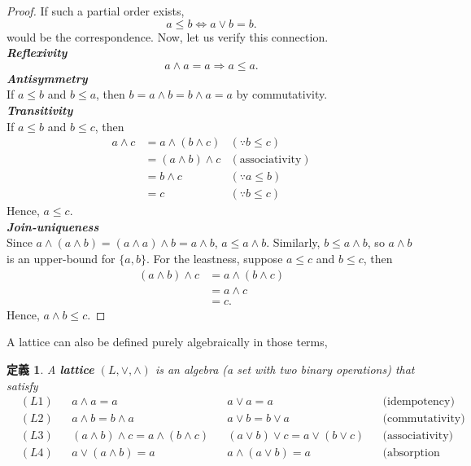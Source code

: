 \documentclass[a4j,12pt]{jarticle}
\numberwithin{equation}{section}
\newcommand{\itbf}[1]{\textit{\textbf{#1}}}
\newtheorem{dfn}{定義}[section]
\begin{document}
\begin{proof}
  If such a partial order exists,
  \begin{equation}
    a \le b \Leftrightarrow a \vee b = b.
  \end{equation}
  would be the correspondence. Now, let us verify this connection.\\
  \itbf{Reflexivity}\\
  \begin{equation}
   a \wedge a = a \Rightarrow a \le a.
  \end{equation}
  \itbf{Antisymmetry}\\
  If $a \le b$ and $b \le a$, then $b = a \wedge b = b \wedge a = a$ by commutativity.\\
  \itbf{Transitivity}\\
  If $a \le b$ and $b \le c$, then
  \begin{align*}
    a \wedge c &= a \wedge (b \wedge c) & (\because b \le c)\\
               &= (a \wedge b) \wedge c & (\text{associativity})\\
               &= b \wedge c & (\because a \le b)\\
               &= c & (\because b \le c)
  \end{align*}
  Hence, $a \le c$.\\
  \itbf{Join-uniqueness}\\
  Since $a \wedge (a \wedge b) = (a \wedge a) \wedge b = a \wedge b$, $a \le a \wedge b$.
  Similarly, $b \le a \wedge b$, so $a \wedge b$ is an upper-bound for $\{a,b\}$. For the leastness, suppose $a \le c$ and $b \le c$, then 
  \begin{align*}
    (a \wedge b) \wedge c &= a \wedge (b \wedge c)\\
                          &= a \wedge c\\
                          &= c.
  \end{align*}
  Hence, $a \wedge b \le c$.
\end{proof}
A lattice can also be defined purely algebraically in those terms,
\begin{dfn}
  A \itbf{lattice} $(L, \vee, \wedge)$ is an algebra (a set with two binary operations) that satisfy
  \begin{align*}
    \label{eq:lattice-def}
    & (L1) &  & a \wedge a = a && a \vee a = a                       &  & \text{(idempotency)}   \\
    & (L2) &  & a \wedge b = b \wedge a && a \vee b = b\vee a        &  & \text{(commutativity)} \\
    & (L3) &  & (a \wedge b) \wedge c = a \wedge (b \wedge c)       &  & (a \vee b) \vee c = a \vee (b\vee c)                 &  & \text{(associativity)} \\
    & (L4) &  & a \vee (a \wedge b) = a && a \wedge (a \vee  b) =  a &  & \text{(absorption identities)}
  \end{align*}
\end{dfn}
\end{document}
